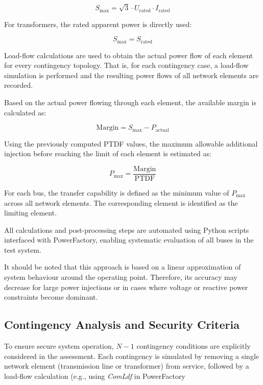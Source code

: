 \begin{equation}
    S_{\text{max}} = \sqrt{3} \cdot U_{\text{rated}} \cdot I_{\text{rated}}
\end{equation}

For transformers, the rated apparent power is directly used:

\begin{equation}
    S_{\text{max}} = S_{\text{rated}}
\end{equation}

Load-flow calculations are used to obtain the actual power flow of each element for every contingency topology. That is, for each contingency case, a load-flow simulation is performed and the resulting power flows of all network elements are recorded.

Based on the actual power flowing through each element, the available margin is calculated as:

\begin{equation}
    \text{Margin} = S_{\text{max}} - P_{\text{actual}}
\end{equation}

Using the previously computed PTDF values, the maximum allowable additional injection before reaching the limit of each element is estimated as:

\begin{equation}
    P_{\text{max}} = \frac{\text{Margin}}{\text{PTDF}}
\end{equation}

For each bus, the transfer capability is defined as the minimum value of $P_{\text{max}}$ across all network elements. The corresponding element is identified as the limiting element.

All calculations and post-processing steps are automated using Python scripts interfaced with PowerFactory, enabling systematic evaluation of all buses in the test system.

It should be noted that this approach is based on a linear approximation of system behaviour around the operating point. Therefore, its accuracy may decrease for large power injections or in cases where voltage or reactive power constraints become dominant.

\subsection{Contingency Analysis and Security Criteria}

To ensure secure system operation, $N-1$ contingency conditions are explicitly considered in the assessment. Each contingency is simulated by removing a single network element (transmission line or transformer) from service, followed by a load-flow calculation (e.g., using \textit{ComLdf} in PowerFactory

